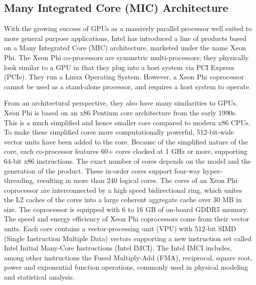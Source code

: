 \subsection{Many Integrated Core (MIC) Architecture\\}
  \vspace{-4mm} 
With the growing success of GPUs as a massively parallel processor well suited to more general purpose applications, Intel has introduced a line of products based on a Many Integrated Core (MIC) architecture, marketed under the name Xeon Phi. The Xeon Phi co-processors are symmetric multi-processors; they physically look similar to a GPU in that they plug into a host system via PCI Express (PCIe). They run a Linux Operating System. However, a Xeon Phi coprocessor cannot be used as a stand-alone processor, and requires a host system to operate.
  
From an architectural perspective, they also have many similarities to GPUs. Xeon Phi is based on an x86 Pentium core architecture from the early 1990s. This is a much simplified and hence smaller core compared to modern x86 CPUs. To make these simplified cores more computationally powerful, 512-bit-wide vector units have been added to the core. Because of the simplified nature of the core, each co-processor features 60+ cores clocked at 1 GHz or more, supporting 64-bit x86 instructions. The exact number of cores depends on the model and the generation of the product. These in-order cores support four-way hyper-threading, resulting in more than 240 logical cores. The cores of an Xeon Phi coprocessor are interconnected by a high speed bidirectional ring, which unites the L2 caches of the cores into a large coherent aggregate cache over 30 MB in size. The coprocessor is equipped with 6 to 16 GB of on-board GDDR5 memory. The speed and energy efficiency of Xeon Phi coprocessors come from their vector units. Each core contains a vector-processing unit (VPU) with 512-bit SIMD (Single Instruction Multiple Data) vectors supporting a new instruction set called Intel Initial Many-Core Instructions (Intel IMCI). The Intel IMCI includes, among other instructions the Fused Multiply-Add (FMA), reciprocal, square root, power and exponential function operations, commonly used in physical modeling and statistical analysis\cite{R:22}.
  

